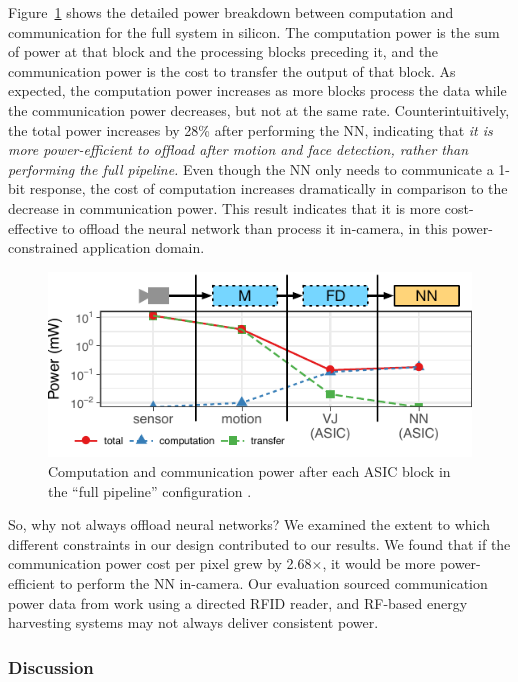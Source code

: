 Figure~\ref{fig:full-face-auth-pipeline} shows the detailed power breakdown between computation and communication for the full system in silicon. The computation power is the sum of power at that block and the processing blocks preceding it, and the communication power is the cost to transfer the output of that block. As expected, the computation power increases as more blocks process the data while the communication power decreases, but not at the same rate. Counterintuitively, the total power increases by 28\% after performing the NN, indicating that \textit{it is more power-efficient to offload after motion and face detection, rather than performing the full pipeline.} Even though the NN only needs to communicate a 1-bit response, the cost of computation increases dramatically in comparison to the decrease in communication power. This result indicates that it is more cost-effective to offload the neural network than process it in-camera, in this power-constrained application domain.

\begin{figure}[h]
\centering
    \begin{center}
      \includegraphics[width=.45\textwidth]{nsp-figs/FA_compute_compress_4up_fig.pdf}
    \end{center}
    \caption{Computation and communication power after each ASIC block in the ``full pipeline'' configuration .}
    \label{fig:full-face-auth-pipeline}
\end{figure}

So, why not always offload neural networks? We examined the extent to which different constraints in our design contributed to our results. We found that if the communication power cost per pixel grew by 2.68$\times$, it would be more power-efficient to perform the NN in-camera. Our evaluation sourced communication power data from work using a directed RFID reader, and RF-based energy harvesting systems may not always deliver consistent power.

\subsubsection{Discussion}

